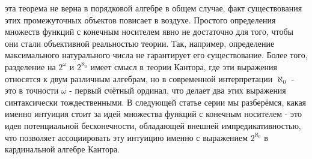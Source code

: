\documentclass[12pt]{article}
\begin{document}
эта теорема не верна в порядковой алгебре в общем случае, факт существования этих промежуточных объектов повисает в воздухе. Простого определения множеств функций с конечным носителем явно не достаточно для того, чтобы они стали объективной реальностью теории. Так, например, определение максимального натурального числа не гарантирует его существование. Более того, разделение на $2^{\omega}$ и $2^{\aleph_0}$ имеет смысл в теории Кантора, где эти выражения относятся к двум различным алгебрам, но в современной интерпретации $\aleph_0$ - это в точности $\omega$ - первый счётный ординал, что делает два этих выражения синтаксически тождественными. В следующей статье серии мы разберёмся, какая именно интуиция стоит за идей множества функций с конечным носителем - это идея потенциальной бесконечности, обладающей внешней импредикативностью, что позволяет ассоциировать эту интуицию именно с выражением $2^{\aleph_0}$ в кардинальной алгебре Кантора. 
\end{document}
